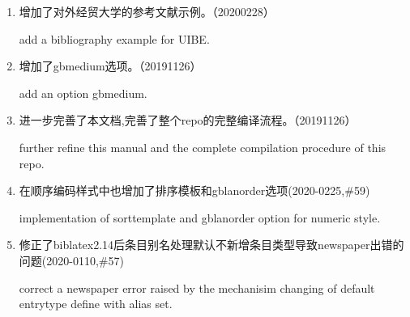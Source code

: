 \label{up:2020304}

\begin{enumerate}

\item 增加了对外经贸大学的参考文献示例。（20200228）

add a bibliography example for UIBE.

\item 增加了gbmedium选项。（20191126）

add an option gbmedium.

\item 进一步完善了本文档,完善了整个repo的完整编译流程。（20191126）

further refine this manual and the complete compilation procedure of this repo.


\item 在顺序编码样式中也增加了排序模板和gblanorder选项(2020-0225,\#59)

implementation of sorttemplate and gblanorder option for numeric style.

\item 修正了biblatex2.14后条目别名处理默认不新增条目类型导致newspaper出错的问题(2020-0110,\#57)

correct a newspaper error raised by the mechanisim changing of default entrytype define with alias set.


\end{enumerate}

\label{up:190828}

